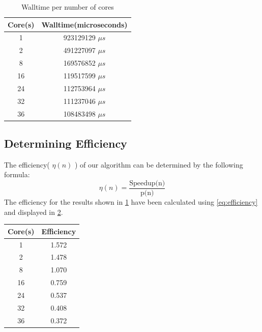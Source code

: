 \documentclass[manuscript,screen, nonacm=true]{acmart}
\begin{document}
\begin{table}[!h]
    \begin{tabular}{||c|c||}
        \hline
        Core(s) & Walltime(microseconds) \\ \hline
        1       & 923129129 $\mu s$ \\ 
        \hline
        2       & 491227097 $\mu s$ \\
        \hline
        8       & 169576852 $\mu s$ \\
        \hline
        16      & 119517599 $\mu s$ \\
        \hline
        24      & 112753964 $\mu s$ \\
        \hline
        32      & 111237046 $\mu s$ \\
        \hline
        36      & 108483498 $\mu s$ \\
        \hline
    \end{tabular}
    \label{table:results}
    \caption{Walltime per number of cores}
\end{table}


\subsection{Determining Efficiency}
The efficiency( $\eta(n)$ ) of our algorithm can be determined by the following formula: 
\begin{equation}
    \eta(n) = \frac{\text{Speedup(n)}}{\text{p(n)}}
    \label{eq:efficiency}
\end{equation}
The efficiency for the results shown in \cref{table:results} have been calculated using \cref{eq:efficiency} and displayed in \cref{table:efficiency}. 

\begin{table}[!h]
    \begin{tabular}{||c|c||}
        \hline
        Core(s) & Efficiency \\ \hline
        1       & 1.572  \\ 
        \hline
        2       & 1.478 \\
        \hline
        8       & 1.070 \\
        \hline
        16      & 0.759 \\
        \hline
        24      & 0.537 \\
        \hline
        32      & 0.408 \\
        \hline
        36      & 0.372 \\
        \hline
    \end{tabular}
    \label{table:efficiency}
\end{table}
\end{document}
